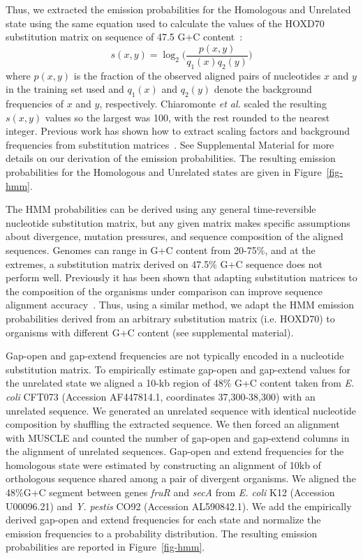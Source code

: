 \documentclass[12pt,journal,letterpaper,onecolumn, draftcls]{IEEEtran}
\begin{document}
Thus, we extracted the emission probabilities for the
Homologous and Unrelated state using the same equation used to
calculate the values of the HOXD70 substitution matrix on sequence of 47.5%
G+C content~\cite{hoxd}:
\begin{equation}
s(x,y)= \log_{2}{\Bigg(\frac{p(x,y)}{q_{1}(x)q_{2}(y)}\Bigg)}
\label{eq-hoxd}
\end{equation}
{w}here $p(x,y)$ is the fraction of the observed aligned pairs of
nucleotides $x$ and $y$ in the training set used and $q_{1}(x)$ and
$q_{2}(y)$ denote the background frequencies of $x$ and $y$,
respectively. Chiaromonte \textit{et al.} scaled the resulting
$s(x,y)$ values so the largest was 100,
with the rest rounded to the nearest integer.  Previous work
has shown how to extract scaling factors and background frequencies from substitution matrices~\cite{ref-rev3a}. See Supplemental Material for
more details on our derivation of the emission probabilities. The resulting emission
probabilities for the Homologous and Unrelated states are given
in Figure~\ref{fig-hmm}.


The HMM probabilities can be derived using any general time-reversible nucleotide substitution matrix,
but any given matrix makes specific assumptions about divergence, mutation pressures,
and sequence composition of the aligned sequences.
Genomes can range in G+C content from 20-75\%, and at the extremes,
a substitution matrix derived on 47.5\% G+C sequence does not
perform well. Previously it has been shown that adapting substitution matrices to the composition
of the organisms under comparison can improve sequence alignment accuracy~\cite{ref-rev3a,ref-rev3b}. Thus, using a similar  method, we adapt the HMM emission
probabilities derived from an arbitrary substitution  matrix (i.e. HOXD70)
to organisms with different G+C content (see supplemental material).

Gap-open and gap-extend frequencies are not typically encoded in a nucleotide substitution matrix.  To empirically estimate gap-open and gap-extend values
for the unrelated state we aligned a 10-kb region of 48\% G+C content
taken from \emph{E. coli} CFT073 (Accession AF447814.1, coordinates
37,300-38,300) with an unrelated sequence.  We generated an unrelated
sequence with identical nucleotide composition by shuffling the extracted sequence.  We then forced an
alignment with MUSCLE and counted the number of gap-open and gap-extend
columns in the alignment of unrelated sequences.  Gap-open and
extend frequencies for the homologous state were estimated by
constructing an alignment of 10kb of orthologous sequence shared among
a pair of divergent organisms.  We aligned the 48\%G+C segment between
genes \textit{fruR} and \textit{secA} from \textit{E. coli} K12
(Accession U00096.21) and \emph{Y. pestis} CO92 (Accession
AL590842.1). We add the empirically derived gap-open and extend
frequencies for each state and normalize the emission frequencies to a
probability distribution.  The resulting emission probabilities are
reported in Figure~\ref{fig-hmm}.
\end{document}
